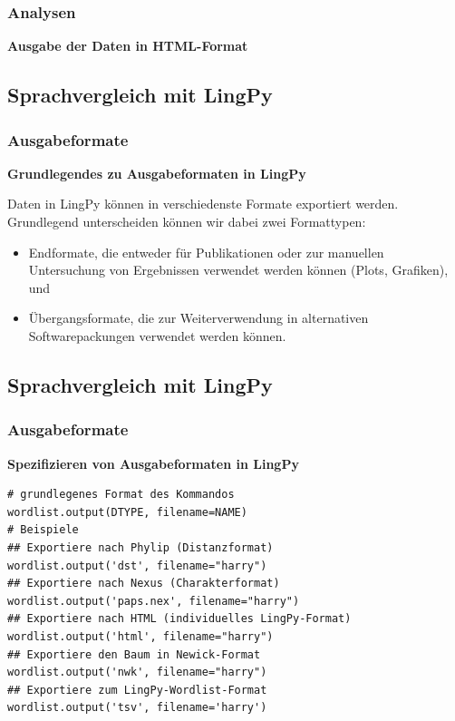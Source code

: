\subsubsection{\texorpdfstring{{Analysen}}{Analysen}}

\textbf{Ausgabe der Daten in HTML-Format}

\subsection{\texorpdfstring{{Sprachvergleich mit
LingPy}}{Sprachvergleich mit LingPy}}

\subsubsection{\texorpdfstring{{Ausgabeformate}}{Ausgabeformate}}

\textbf{Grundlegendes zu Ausgabeformaten in LingPy}

Daten in LingPy können in verschiedenste Formate exportiert werden.
Grundlegend unterscheiden können wir dabei zwei Formattypen:

\begin{itemize}
\itemsep1pt\parskip0pt
\item
  Endformate, die entweder für Publikationen oder zur manuellen
  Untersuchung von Ergebnissen verwendet werden können (Plots,
  Grafiken), und
\item
  Übergangsformate, die zur Weiterverwendung in alternativen
  Softwarepackungen verwendet werden können.
\end{itemize}

\subsection{\texorpdfstring{{Sprachvergleich mit
LingPy}}{Sprachvergleich mit LingPy}}

\subsubsection{\texorpdfstring{{Ausgabeformate}}{Ausgabeformate}}

\textbf{Spezifizieren von Ausgabeformaten in LingPy}

\begin{verbatim}
# grundlegenes Format des Kommandos
wordlist.output(DTYPE, filename=NAME)
# Beispiele
## Exportiere nach Phylip (Distanzformat)
wordlist.output('dst', filename="harry")
## Exportiere nach Nexus (Charakterformat)
wordlist.output('paps.nex', filename="harry")
## Exportiere nach HTML (individuelles LingPy-Format)
wordlist.output('html', filename="harry")
## Exportiere den Baum in Newick-Format
wordlist.output('nwk', filename="harry")
## Exportiere zum LingPy-Wordlist-Format
wordlist.output('tsv', filename='harry')
\end{verbatim}

